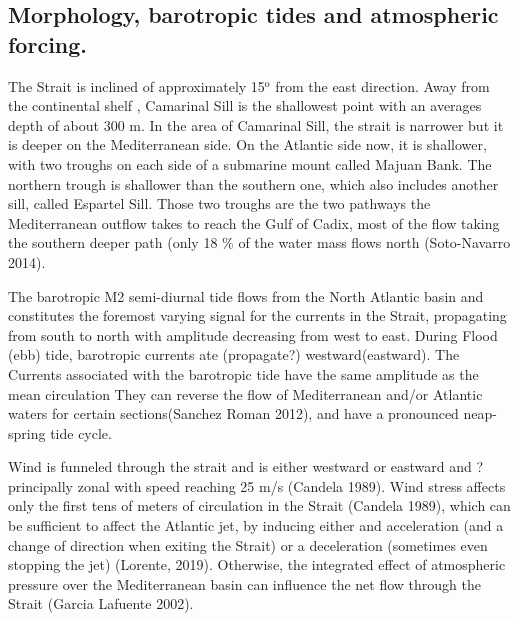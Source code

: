 \color{blue}\subsection{Morphology, barotropic tides and atmospheric forcing.} \color{black}


The Strait is inclined of \color{blue}approximately \color{black} 15$^\text{o}$ from the east direction. Away from \color{blue}the continental shelf \color{black}, Camarinal Sill is the shallowest point with \color{blue}an averages depth of about 300 m. In the area of Camarinal Sill, the strait is narrower but it is deeper on the Mediterranean side. \color{black} On the Atlantic side now, it is shallower, with two troughs on each side of a submarine mount called Majuan Bank. The northern trough is shallower than the southern one, which also includes another sill, called Espartel Sill. Those two troughs are the two pathways the  \color{blue}Mediterranean outflow takes \color{black} to \color{blue} reach \color{black} the Gulf of Cadix, most of the flow taking the southern deeper path  \color{blue}(only 18 \% of the water mass flows north (Soto-Navarro 2014)\color{black}.


The barotropic M2 semi-diurnal tide \color{blue} flows \color{black} from the North Atlantic \color{blue}basin and constitutes \color{black} the foremost varying signal for the currents in the Strait, propagating from south to north with amplitude decreasing from west to east\citep{candela_1990}. During Flood (ebb) tide, barotropic currents ate \color{blue}(propagate?) \color{black} westward(eastward). The Currents associated with the barotropic tide \color{blue} have the \color{black} same amplitude as the mean circulation \color{blue} They \color{black} can reverse the flow of Mediterranean and/or Atlantic waters for certain sections(Sanchez Roman 2012), and have a pronounced neap-spring tide cycle.

Wind is funneled through the strait and is either westward or eastward \color{blue}and ? \color{black} principally zonal with speed \color{blue}reaching \color{black} 25 m/s (Candela 1989). Wind stress affects only the first tens of meters of circulation in the Strait (Candela 1989), which can be sufficient to affect the Atlantic jet, by \color{blue}inducing either and acceleration (and a change of direction when exiting the Strait) or a deceleration (sometimes even stopping the jet) \color{black}(Lorente, 2019). Otherwise, the integrated effect of atmospheric pressure over the Mediterranean basin \color{blue} can \color{black} influence the net flow through the Strait (Garcia Lafuente 2002).





